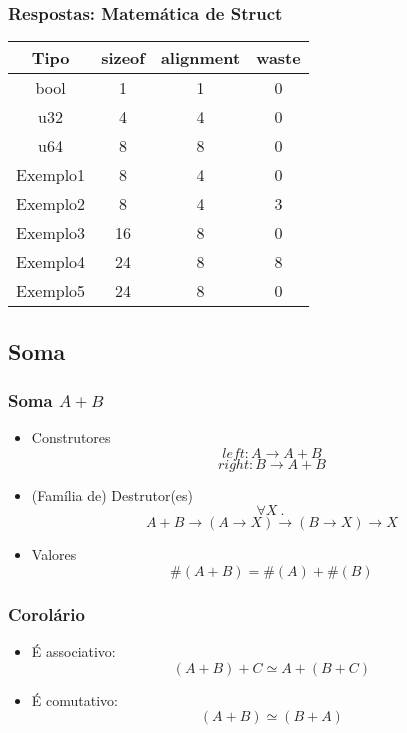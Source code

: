 \documentclass{beamer}
\renewcommand{\d}{\:.\:}
\newcommand{\typetam}{\#}
\newcommand{\typesim}{\simeq}
\begin{document}
\begin{frame}
    \frametitle{Respostas: Matemática de Struct}
    \begin{center} \begin{tabular}{|c|c|c||c|}
        \hline%
        Tipo      & sizeof & alignment & waste \\\hline
        \hline
        bool      & 1      & 1         & 0     \\\hline
        u32       & 4      & 4         & 0     \\\hline
        u64       & 8      & 8         & 0     \\\hline
        \hline
        Exemplo1  & 8      & 4         & 0     \\\hline
        Exemplo2  & 8      & 4         & 3     \\\hline
        Exemplo3  & 16     & 8         & 0     \\\hline
        Exemplo4  & 24     & 8         & 8     \\\hline
        Exemplo5  & 24     & 8         & 0     \\\hline
    \end{tabular} \end{center}
\end{frame}

\subsection{Soma}
\begin{frame}
    \frametitle{Soma \(A + B\)}
    \begin{itemize}
        \item Construtores
            \[
                left : A \to A + B
            \] \[
                right : B \to A + B
            \]
            \vfill
        \item (Família de) Destrutor(es)
            \[
                \forall X \d
            \] \[
                A + B \to (A \to X) \to (B \to X) \to X
            \]
            \vfill
        \item Valores
            \[
                \typetam(A + B) = \typetam(A) + \typetam(B)
            \]
    \end{itemize}
\end{frame}

\begin{frame}
    \frametitle{Corolário}
    \begin{itemize}
        \item É associativo:
            \[
                (A + B) + C \typesim A + (B + C)
            \]
            \vfill
        \item É comutativo:
            \[
                (A + B) \typesim (B + A)
            \]
    \end{itemize}
\end{frame}
\end{document}
